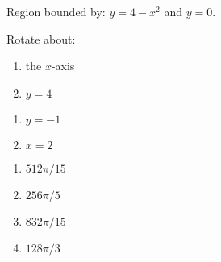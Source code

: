 {Region bounded by: $y=4-x^2$ and $y=0$.

Rotate about:

\noindent%
\begin{minipage}[t]{.5\linewidth}
\begin{enumerate}
\item		the $x$-axis
\item		$y=4$
\end{enumerate}
\end{minipage}
\begin{minipage}[t]{.5\linewidth}
\begin{enumerate}\addtocounter{enumii}{2}
\item		$y=-1$
\item		$x=2$
\end{enumerate}
\end{minipage}
}
{\begin{enumerate}
\item $512\pi/15$
\item $256\pi/5$
\item $832\pi/15$
\item $128\pi/3$
\end{enumerate}
}
